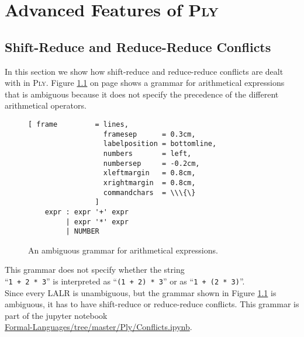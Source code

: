 \chapter{Advanced Features of \textsc{Ply}}

\section{Shift-Reduce and Reduce-Reduce Conflicts}
In this section we show how shift-reduce and reduce-reduce conflicts are dealt with in \textsc{Ply}.
Figure \ref{fig:Conflicts.ipynb} on page \pageref{fig:Conflicts.ipynb} shows a grammar for arithmetical
expressions that is ambiguous because it does not specify the precedence of the different arithmetical
operators.  


\begin{figure}[!ht]
\centering
\begin{Verbatim}[ frame         = lines, 
                  framesep      = 0.3cm, 
                  labelposition = bottomline,
                  numbers       = left,
                  numbersep     = -0.2cm,
                  xleftmargin   = 0.8cm,
                  xrightmargin  = 0.8cm,
                  commandchars  = \\\{\}
                ]
    expr : expr '+' expr
         | expr '*' expr
         | NUMBER      
\end{Verbatim}
\vspace*{-0.3cm}
\caption{An ambiguous grammar for arithmetical expressions.}
\label{fig:Conflicts.ipynb}
\end{figure}
\FloatBarrier

\noindent
This grammar does not specify whether the string
\\[0.2cm]
\hspace*{1.3cm} 
``\texttt{1 + 2 * 3}'' \quad is interpreted as \quad  ``\texttt{(1 + 2) * 3}'' \quad or as \quad ``\texttt{1 +
  (2 * 3)}''. 
\\[0.2cm]
Since every LALR is unambiguous, but the grammar shown in Figure \ref{fig:Conflicts.ipynb} is ambiguous,  it
has to have shift-reduce or reduce-reduce conflicts.  This grammar is part of the jupyter notebook 
\\[0.2cm]
\hspace*{1.3cm}
\href{https://github.com/karlstroetmann/Formal-Languages/tree/master/Ply/Conflicts.ipynb}{Formal-Languages/tree/master/Ply/Conflicts.ipynb}.


